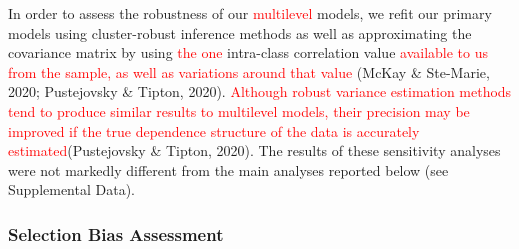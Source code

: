 \documentclass[
  english,
  man, donotrepeattitle,mask,floatsintext]{apa7}
\begin{document}
In order to assess the robustness of our \textcolor{red}{multilevel} models, we refit our primary models using cluster-robust inference methods as well as approximating the covariance matrix by using \textcolor{red}{the one} intra-class correlation value \textcolor{red}{available to us from the sample, as well as variations around that value} (McKay \& Ste-Marie, 2020; Pustejovsky \& Tipton, 2020). \textcolor{red}{Although robust variance estimation methods tend to produce similar results to multilevel models, their precision may be improved if the true dependence structure of the data is accurately estimated}(Pustejovsky \& Tipton, 2020). The results of these sensitivity analyses were not markedly different from the main analyses reported below (see Supplemental Data).

\hypertarget{selection-bias-assessment}{%
\subsubsection{Selection Bias Assessment}\label{selection-bias-assessment}}
\end{document}
